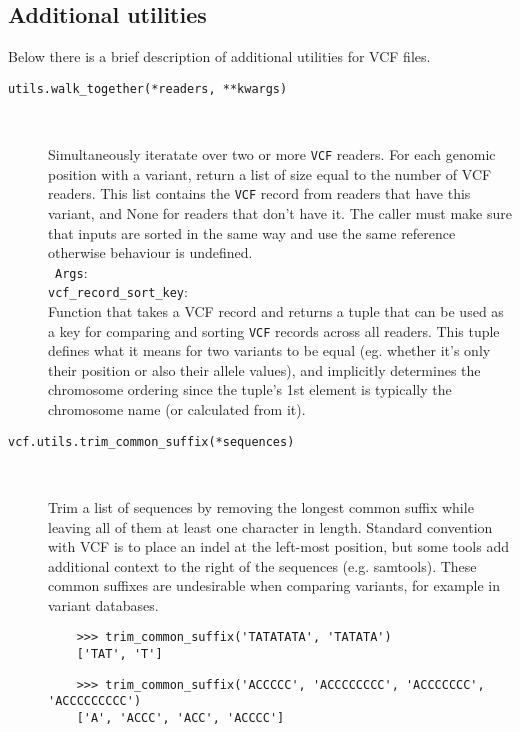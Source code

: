 \subsection{Additional utilities}

\noindent Below there is a brief description of additional utilities for VCF files.


\begin{description}

    \item[\texttt{utils.walk\_together(*readers, **kwargs)}] \

    Simultaneously iteratate over two or more \verb|VCF| readers. For each genomic position with a variant,
    return a list of size equal to the number of VCF readers. This list contains the \verb|VCF| record from
    readers that have this variant, and None for readers that don’t have it. The caller must make sure
    that inputs are sorted in the same way and use the same reference otherwise behaviour is undefined.\\
    \
   \noindent\verb|Args|:\\
            \verb|vcf_record_sort_key|: \\

    Function that takes a VCF record and returns a
    tuple that can be used as a key for comparing and sorting \verb|VCF| records across all readers.
    This tuple defines what it means for two variants to be equal (eg. whether it’s only their
    position or also their allele values), and implicitly determines the chromosome ordering since
    the tuple’s 1st element is typically the chromosome name (or calculated from it).


    \item[\texttt{vcf.utils.trim\_common\_suffix(*sequences)}] \

    Trim a list of sequences by removing the longest common suffix while leaving all of them at least one
    character in length. Standard convention with VCF is to place an indel at the left-most position,
    but some tools add additional context to the right of the sequences (e.g. samtools).
    These common suffixes are undesirable when comparing variants, for example in variant databases.

    \begin{verbatim}
    >>> trim_common_suffix('TATATATA', 'TATATA')
    ['TAT', 'T']
    \end{verbatim}

    \begin{verbatim}
    >>> trim_common_suffix('ACCCCC', 'ACCCCCCCC', 'ACCCCCCC', 'ACCCCCCCCC')
    ['A', 'ACCC', 'ACC', 'ACCCC']
    \end{verbatim}

   
    \end{description}

